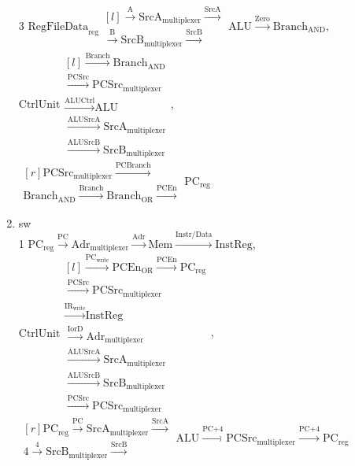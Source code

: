 \documentclass{article}
\begin{document}
\begin{enumerate}
3 $\text{RegFileData}_\text{reg} \begin{matrix*}[l] \xrightarrow{\text{A}} \text{SrcA}_\text{multiplexer} \xrightarrow{\text{SrcA}} \\ \xrightarrow{\text{B}} \text{SrcB}_\text{multiplexer} \xrightarrow{\text{SrcB}} \end{matrix*} \text{ALU} \xrightarrow{\text{Zero}} \text{Branch}_\text{AND}$, $\text{CtrlUnit} \begin{matrix*}[l] \xrightarrow{\text{Branch}} \text{Branch}_\text{AND} \\ \xrightarrow{\text{PCSrc}} \text{PCSrc}_\text{multiplexer} \\
\xrightarrow{\text{ALUCtrl}} \text{ALU} \\ \xrightarrow{\text{ALUSrcA}} \text{SrcA}_\text{multiplexer} \\ \xrightarrow{\text{ALUSrcB}} \text{SrcB}_\text{multiplexer} \end{matrix*}$,\\
$\begin{matrix*}[r] \text{PCSrc}_\text{multiplexer} \xrightarrow{\text{PCBranch}} \\  \text{Branch}_\text{AND} \xrightarrow{\text{Branch}} \text{Branch}_\text{OR} \xrightarrow{\text{PCEn}}\end{matrix*} \text{PC}_\text{reg}$

\bigbreak

    \item sw\\
1 $\text{PC}_\text{reg} \xrightarrow{\text{PC}} \text{Adr}_\text{multiplexer} \xrightarrow{\text{Adr}} \text{Mem} \xrightarrow{\text{Instr/Data}} \text{InstReg}$, $\text{CtrlUnit} \begin{matrix*}[l] 
\xrightarrow{\text{PC}_\text{write}} \text{PCEn}_\text{OR} \xrightarrow{\text{PCEn}} \text{PC}_\text{reg} \\ 
\xrightarrow{\text{PCSrc}} \text{PCSrc}_\text{multiplexer} \\
\xrightarrow{\text{IR}_\text{write}} \text{InstReg} \\
\xrightarrow{\text{IorD}} \text{Adr}_\text{multiplexer} \\ \xrightarrow{\text{ALUSrcA}} \text{SrcA}_\text{multiplexer} \\ \xrightarrow{\text{ALUSrcB}} \text{SrcB}_\text{multiplexer} \\ \xrightarrow{\text{PCSrc}} \text{PCSrc}_\text{multiplexer} \end{matrix*}$,\\ $\begin{matrix*}[r] \text{PC}_\text{reg} \xrightarrow{\text{PC}} \text{SrcA}_\text{multiplexer} \xrightarrow{\text{SrcA}} \\ \text{4} \xrightarrow{\text{4}} \text{SrcB}_\text{multiplexer} \xrightarrow{\text{SrcB}}\end{matrix*} \text{ALU} \xrightarrow{\text{PC+4}} \text{PCSrc}_\text{multiplexer} \xrightarrow{\text{PC+4}} \text{PC}_\text{reg}$\\


\end{enumerate}
\end{document}
